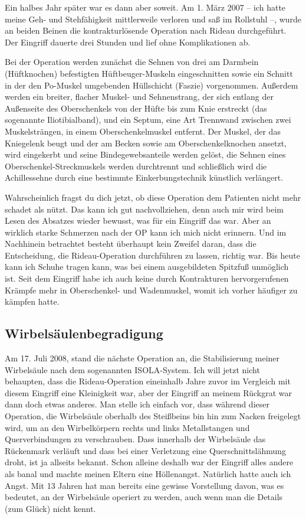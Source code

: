 \documentclass[fontsize=14pt,a4paper,headinclude,DIV=calc,automark]{scrbook}
\begin{document}
Ein halbes Jahr später war es dann aber soweit. Am 1. März 2007 – ich hatte meine Geh- und Stehfähigkeit mittlerweile verloren und saß im Rollstuhl –, wurde an beiden Beinen die kontrakturlösende Operation nach Rideau durchgeführt. Der Eingriff dauerte drei Stunden und lief ohne Komplikationen ab.

Bei der Operation werden zunächst die Sehnen von drei am Darmbein (Hüftknochen) befestigten Hüftbeuger-Muskeln eingeschnitten sowie ein Schnitt in der den Po-Muskel umgebenden Hüllschicht (Faszie) vorgenommen. Außerdem werden ein breiter, flacher Muskel- und Sehnenstrang, der sich entlang der Außenseite des Oberschenkels von der Hüfte bis zum Knie erstreckt (das sogenannte Iliotibialband), und ein Septum, eine Art Trennwand zwischen zwei Muskelsträngen, in einem Oberschenkelmuskel entfernt. Der Muskel, der das Kniegelenk beugt und der am Becken sowie am Oberschenkelknochen ansetzt, wird eingekerbt und seine Bindegewebsanteile werden gelöst, die Sehnen eines Oberschenkel-Streckmuskels werden durchtrennt und schließlich wird die Achillessehne durch eine bestimmte Einkerbungstechnik künstlich verlängert.

Wahrscheinlich fragst du dich jetzt, ob diese Operation dem Patienten nicht mehr schadet als nützt. Das kann ich gut nachvollziehen, denn auch mir wird beim Lesen des Absatzes wieder bewusst, was für ein Eingriff das war. Aber an wirklich starke Schmerzen nach der OP kann ich mich nicht erinnern. Und im Nachhinein betrachtet besteht überhaupt kein Zweifel daran, dass die Entscheidung, die Rideau-Operation durchführen zu lassen, richtig war. Bis heute kann ich Schuhe tragen kann, was bei einem ausgebildeten Spitzfuß unmöglich ist. Seit dem Eingriff habe ich auch keine durch Kontrakturen hervorgerufenen Krämpfe mehr in Oberschenkel- und Wadenmuskel, womit ich vorher häufiger zu kämpfen hatte.

\subsection{Wirbelsäulenbegradigung}
\label{sec:wirbelsaeulenversteifung}
Am 17. Juli 2008, stand die nächste Operation an, die Stabilisierung meiner Wirbelsäule nach dem sogenannten ISOLA-System. Ich will jetzt nicht behaupten, dass die Rideau-Operation eineinhalb Jahre zuvor im Vergleich mit diesem Eingriff eine Kleinigkeit war, aber der Eingriff an meinem Rückgrat war dann doch etwas anderes. Man stelle ich einfach vor, dass während dieser Operation, die Wirbelsäule oberhalb des Steißbeins bin hin zum Nacken freigelegt wird, um an den Wirbelkörpern rechts und links Metallstangen und Querverbindungen zu verschrauben. Dass innerhalb der Wirbelsäule das Rückenmark verläuft und dass bei einer Verletzung eine Querschnittslähmung droht, ist ja allseits bekannt. Schon alleine deshalb war der Eingriff alles andere als banal und machte meinen Eltern eine Höllenangst. Natürlich hatte auch ich Angst. Mit 13 Jahren hat man bereits eine gewisse Vorstellung davon, was es bedeutet, an der Wirbelsäule operiert zu werden, auch wenn man die Details (zum Glück) nicht kennt.
\end{document}
